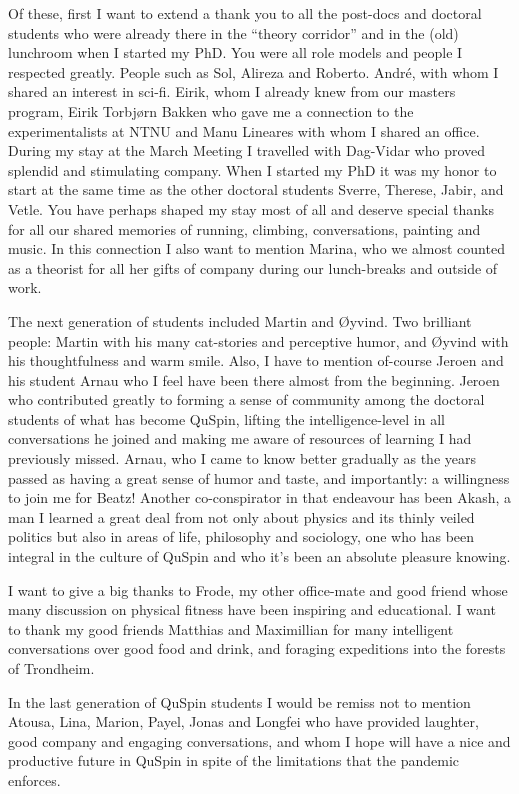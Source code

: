 Of these, first I want to extend a thank you to all the post-docs and doctoral students who were already there in the ``theory corridor'' and in the
(old) lunchroom when I started my PhD. You were all
role models and people I respected greatly. People such as Sol, Alireza and Roberto. Andr\'e, with whom I shared an interest in sci-fi. Eirik,
whom I already knew from our masters program, Eirik Torbjørn Bakken who gave me a connection to the experimentalists at NTNU and Manu Lineares
with whom I shared an office. During my stay at the March Meeting I travelled with Dag-Vidar who proved splendid and
stimulating company.
When I started my PhD it was my honor to start at the same time as the other doctoral students Sverre, Therese, Jabir, and Vetle.
You have perhaps shaped my stay most of all and deserve special thanks for all our shared memories of running, climbing,
conversations, painting and music. In this connection I also want to mention Marina, who we almost counted as a theorist
for all her gifts of company during our lunch-breaks and outside of work.

The next generation of students included Martin and Øyvind. Two brilliant people: Martin with his many cat-stories and
perceptive humor, and Øyvind with his thoughtfulness and warm smile. Also, I have to mention of-course Jeroen and his student
Arnau who I feel have been there almost from the beginning. Jeroen who contributed greatly to forming a sense
of community among the doctoral students of what has become QuSpin, lifting the intelligence-level in all conversations
he joined and making me aware of resources of learning I had previously missed. Arnau, who I came to know better gradually as the
years passed as having a great sense of humor and taste, and importantly: a willingness to join me for Beatz! Another
co-conspirator in that endeavour has been Akash, a man I learned a great deal from not only about physics and its
thinly veiled politics but also in areas of life, philosophy and sociology, one who has been integral in the culture
of QuSpin and who it's been an absolute pleasure knowing.

I want to give a big thanks to Frode, my other office-mate and good friend whose many discussion on physical fitness
have been inspiring and educational. I want to thank my good friends Matthias and Maximillian for many intelligent
conversations over good food and drink, and foraging expeditions into the forests of Trondheim.

In the last generation of QuSpin students I would be remiss not to mention Atousa, Lina, Marion, Payel, Jonas and Longfei
who have provided laughter, good company and engaging conversations, and whom I hope will have a
nice and productive future in QuSpin in spite of the limitations that the pandemic enforces.


